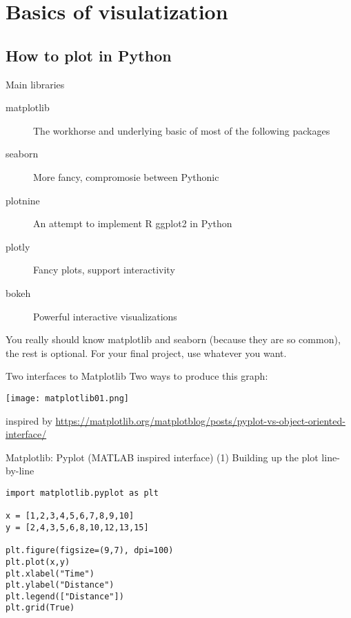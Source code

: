 \section{Basics of visulatization}



\subsection{How to plot in Python}

\begin{frame}{Main libraries}
  
\begin{description}
\item[matplotlib] The workhorse and underlying basic of most of the following packages
\item[seaborn] More fancy, compromosie between Pythonic
\item[plotnine] An attempt to implement R ggplot2 in Python
\item[plotly] Fancy plots, support interactivity
\item[bokeh] Powerful interactive visualizations
\end{description}

\pause

You really should know matplotlib and seaborn (because they are so common), the rest is optional. For your final project, use whatever you want.

\end{frame}




\begin{frame}[fragile]{Two interfaces to Matplotlib}
  Two ways to produce this graph:
  
  \centering
\texttt{[image: matplotlib01.png]}\hfill


\tiny inspired by \url{https://matplotlib.org/matplotblog/posts/pyplot-vs-object-oriented-interface/}


\end{frame}



\begin{frame}[fragile]{Matplotlib: Pyplot (MATLAB inspired interface)}
(1) Building up the plot line-by-line
  
\begin{verbatim}
import matplotlib.pyplot as plt

x = [1,2,3,4,5,6,7,8,9,10]
y = [2,4,3,5,6,8,10,12,13,15]

plt.figure(figsize=(9,7), dpi=100)
plt.plot(x,y)
plt.xlabel("Time")
plt.ylabel("Distance")
plt.legend(["Distance"])
plt.grid(True)
\end{verbatim}

 
\end{frame}


